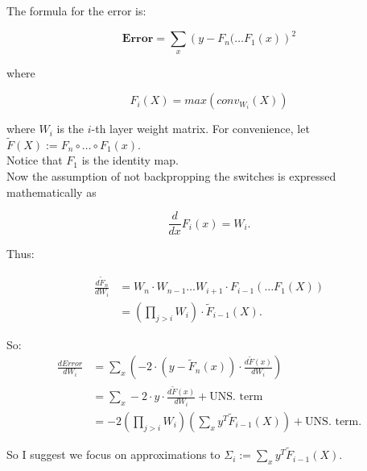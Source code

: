 \documentclass[11pt]{article}
\title{}
\author{}
\date{}
\begin{document}

\maketitle

\thispagestyle{empty}

The formula for the error is:

$$\textbf{Error} = \sum_{x} \left (y - F_n( \ldots F_1(x) \right)^2$$

where 

$$F_i(X) = max(conv_{W_i}(X))$$

where $W_i$ is the $i$-th layer weight matrix.   For convenience, let $\tilde{F}(X) := F_n \circ \ldots \circ F_1 (x)$. \\

Notice that $F_1$ is the identity map. \\

Now the assumption of not backpropping the switches is expressed mathematically as

$$\frac{d}{dx}F_i(x) = W_i.$$

Thus:

\begin{eqnarray*}
\frac{d \tilde{F}_n}{d W_i} & = W_n \cdot W_{n-1} \ldots W_{i+1} \cdot F_{i-1}( \ldots F_1(X)) \\
                            & = \left( \prod_{j > i} W_i \right) \cdot \tilde{F}_{i-1}(X).
\end{eqnarray*}                 
                 
So:                        
\begin{eqnarray*}
\frac{d Error}{d W_i} & = \sum_x \left ( -2 \cdot (y - \tilde{F}_n(x)) \cdot \frac{d\tilde{F}(x)}{dW_i} \right ) \\     
                      & = \sum_x -2 \cdot y \cdot  \frac{d\tilde{F}(x)}{dW_i} + \text{UNS. term} \\
                      & = -2 \left(\prod_{j > i} W_i \right) \left(\sum_x y^T \tilde{F}_{i-1}(X) \right) + \text{UNS. term}.
\end{eqnarray*}

So I suggest we focus on approximations to $\Sigma_{i} := \sum_x y^T \tilde{F}_{i-1}(X)$.

\newpage

\footnotesize{

\linespread{0.9}

}
\end{document}
